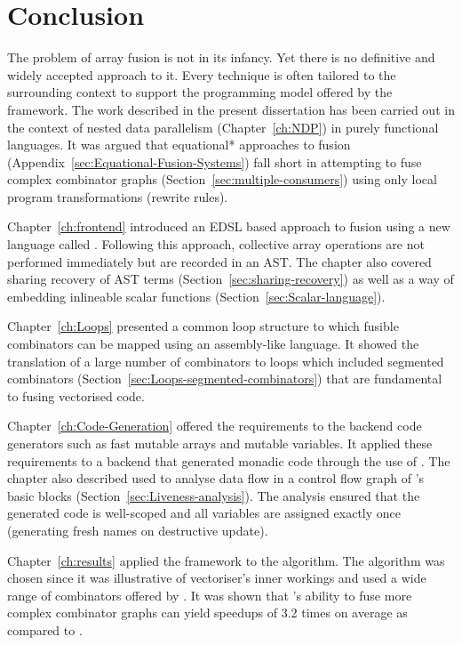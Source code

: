 \documentclass[preamble.tex]{subfiles}
\begin{document}
\clearpage

\chapter{Conclusion}

The problem of array fusion is not in its infancy. Yet there is no definitive and widely accepted approach to it. Every technique is often tailored to the surrounding context to support the programming model offered by the framework. The work described in the present dissertation has been carried out in the context of nested data parallelism (Chapter~\ref{ch:NDP}) in purely functional languages. It was argued that \*equational* approaches to fusion (Appendix~\ref{sec:Equational-Fusion-Systems}) fall short in attempting to fuse complex combinator graphs (Section~\ref{sec:multiple-consumers}) using only local program transformations (rewrite rules).

Chapter~\ref{ch:frontend} introduced an EDSL based approach to fusion using a new language called \LiveFusion. Following this approach, collective array operations are not performed immediately but are recorded in an AST. The chapter also covered sharing recovery of AST terms (Section~\ref{sec:sharing-recovery}) as well as a way of embedding inlineable scalar functions (Section~\ref{sec:Scalar-language}).

Chapter~\ref{ch:Loops} presented a common loop structure to which fusible combinators can be mapped using an assembly-like \Loop language. It showed the translation of a large number of combinators to loops which included segmented combinators (Section~\ref{sec:Loops-segmented-combinators}) that are fundamental to fusing vectorised code.

Chapter~\ref{ch:Code-Generation} offered the requirements to the backend code generators such as fast mutable arrays and mutable variables. It applied these requirements to a backend that generated monadic \Haskell code through the use of . The chapter also described  used to analyse data flow in a control flow graph of \Loop's basic blocks (Section~\ref{sec:Liveness-analysis}). The analysis ensured that the generated code is well-scoped and all variables are assigned exactly once (generating fresh names on destructive update).

Chapter~\ref{ch:results} applied the \LiveFusion framework to the \QuickHull algorithm. The algorithm was chosen since it was illustrative of \DPH vectoriser's inner workings and used a wide range of combinators offered by \LiveFusion. It was shown that \LiveFusion's ability to fuse more complex combinator graphs can yield speedups of 3.2 times on average as compared to \StreamFusion.
\end{document}

